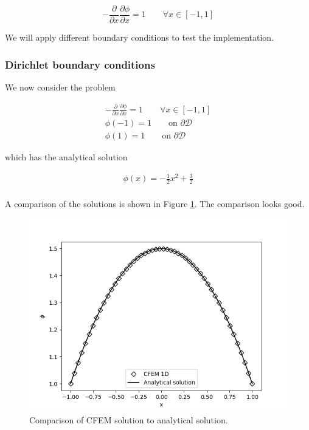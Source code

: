 \documentclass[11pt,letterpaper,titlepage]{article}
\newcommand{\bOmega}{\mathcal{D}}
\numberwithin{equation}{section}
\begin{document}
\begin{equation*}
-\frac{\partial}{\partial x} \frac{\partial \phi}{\partial x} = 1 \quad \quad \forall x \in [-1,1]
\end{equation*}

We will apply different boundary conditions to test the implementation.

\subsubsection{Dirichlet boundary conditions}
We now consider the problem

\begin{equation*}
\begin{aligned}
-\frac{\partial}{\partial x} \frac{\partial \phi}{\partial x} = 1 \quad \quad \forall x \in [-1,1] \\
\phi(-1) = 1 \quad \quad \text{on } \partial \bOmega \\
\phi(1) = 1 \quad \quad \text{on } \partial \bOmega
\end{aligned}
\end{equation*}

which has the analytical solution

\begin{equation*}
\begin{aligned}
\phi(x) = -\frac{1}{2}x^2 + \frac{3}{2} \\
\end{aligned}
\end{equation*}

A comparison of the solutions is shown in Figure \ref{fig:Diffusion1a}. The comparison looks good.

\begin{figure}[H]
\centering
\includegraphics[width=0.8\linewidth]{Figures/Diffusion1a}
\caption{Comparison of CFEM solution to analytical solution.}
\label{fig:Diffusion1a}
\end{figure}
\end{document}
